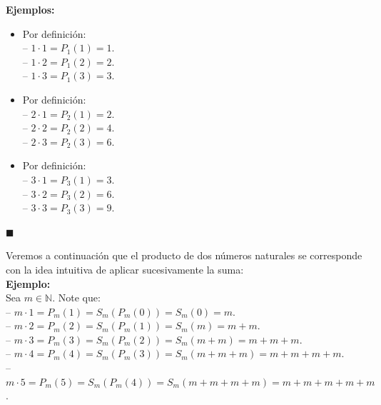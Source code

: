 \documentclass[10 pt]{article}
\begin{document}
\Large{\textbf{Ejemplos:}} \\

\begin{itemize}
    \item \Large{Por definición: \\

    -- $1 \cdot 1=P_1(1)=1$. \\

    -- $1 \cdot 2=P_1(2)=2$. \\

    -- $1 \cdot 3=P_1(3)=3$.}\\

    \item \Large{Por definición: \\

    -- $2 \cdot 1=P_2(1)=2$.  \\

    -- $2 \cdot 2=P_2(2)=4$. \\

    -- $2 \cdot 3=P_2(3)=6$.} \\

    \item \Large{Por definición: \\

    -- $3 \cdot 1=P_3(1)=3$. \\

    -- $3 \cdot 2=P_3(2)=6$. \\

    -- $3 \cdot 3=P_3(3)=9$.} \\
\end{itemize}

\begin{flushright}
    $\blacksquare$
\end{flushright}

\Large{Veremos a continuación que el producto de dos números naturales se corresponde con la idea intuitiva de aplicar sucesivamente la suma:} \\

\Large{\textbf{Ejemplo:}} \\

\Large{Sea $m \in \mathbb N$. Note que: \\

-- $m \cdot 1=P_m(1)=S_m(P_m(0))=S_m(0)=m$. \\

-- $m \cdot 2=P_m(2)=S_m(P_m(1))=S_m(m)=m+m$. \\

-- $m \cdot 3=P_m(3)=S_m(P_m(2))=S_m(m+m)=m+m+m$. \\

-- $m \cdot 4=P_m(4)=S_m(P_m(3))=S_m(m+m+m)=m+m+m+m$. \\

-- $m \cdot 5=P_m(5)=S_m(P_m(4))=S_m(m+m+m+m)=m+m+m+m+m$.} \\
\end{document}
